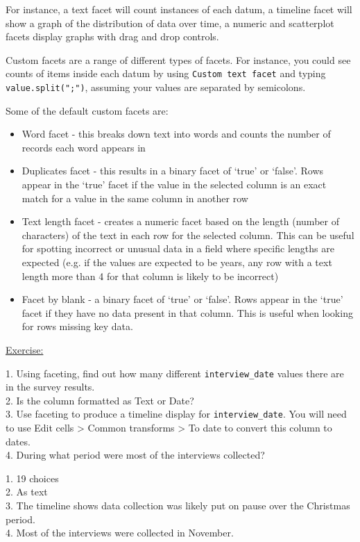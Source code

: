 \documentclass[12pt]{article}
\begin{document}
For instance, a text facet will count instances of each datum, a timeline facet will show a graph of the distribution of data over time, a numeric and scatterplot facets display graphs with drag and drop controls.

Custom facets are a range of different types of facets. For instance, you could see counts of items inside each datum by using \texttt{Custom text facet} and typing \texttt{value.split(";")}, assuming your values are separated by semicolons. 

Some of the default custom facets are:

\begin{itemize}
    \item Word facet - this breaks down text into words and counts the number of records each word appears in
    \item Duplicates facet - this results in a binary facet of ‘true’ or ‘false’. Rows appear in the ‘true’ facet if the value in the selected column is an exact match for a value in the same column in another row
    \item Text length facet - creates a numeric facet based on the length (number of characters) of the text in each row for the selected column. This can be useful for spotting incorrect or unusual data in a field where specific lengths are expected (e.g. if the values are expected to be years, any row with a text length more than 4 for that column is likely to be incorrect)
    \item Facet by blank - a binary facet of ‘true’ or ‘false’. Rows appear in the ‘true’ facet if they have no data present in that column. This is useful when looking for rows missing key data.
    

\end{itemize}

\newpage
\begin{addmargin}[1cm]{0cm}
\color{gray}
\underline{Exercise:}

1. Using faceting, find out how many different \texttt{interview\_date} values there are in the survey results.
\\2. Is the column formatted as Text or Date?
\\3. Use faceting to produce a timeline display for \texttt{interview\_date}. You will need to use Edit cells > Common transforms > To date to convert this column to dates.
\\4. During what period were most of the interviews collected?

\color{black}\vspace{1em}
1. 19 choices
\\2. As text
\\3. The timeline shows data collection was likely put on pause over the Christmas period.
\\4. Most of the interviews were collected in November.

\end{addmargin}
\end{document}
